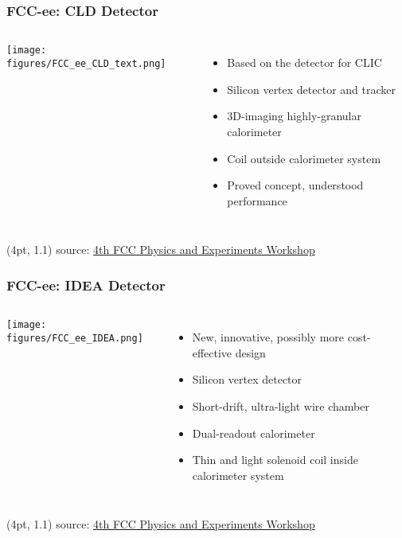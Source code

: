 \documentclass[aspectratio=169]{beamer}
\begin{document}
\begin{frame}
  \frametitle{FCC-ee: CLD Detector}

  \begin{columns}[c]
    \begin{center}
      \texttt{[image: figures/FCC\_ee\_CLD\_text.png]}
    \end{center}

    \begin{itemize}
      \item Based on the detector for CLIC
      \item Silicon vertex detector and tracker
      \item 3D-imaging highly-granular calorimeter
      \item Coil outside calorimeter system
      \item Proved concept, understood performance
    \end{itemize}
  \end{columns}

  \begin{textblock*}{\paperwidth}(4pt, 1.1\textheight)
    \tiny source:
    \href{https://indico.cern.ch/event/932973/}
         {4th FCC Physics and Experiments Workshop}
  \end{textblock*}
\end{frame}

\begin{frame}
  \frametitle{FCC-ee: IDEA Detector}

  \begin{columns}[c]
    \begin{center}
      \texttt{[image: figures/FCC\_ee\_IDEA.png]}
    \end{center}

    \begin{itemize}
      \item New, innovative, possibly more cost-effective design
      \item Silicon vertex detector
      \item Short-drift, ultra-light wire chamber
      \item Dual-readout calorimeter
      \item Thin and light solenoid coil inside calorimeter system
    \end{itemize}
  \end{columns}

  \begin{textblock*}{\paperwidth}(4pt, 1.1\textheight)
    \tiny source:
    \href{https://indico.cern.ch/event/932973/}
         {4th FCC Physics and Experiments Workshop}
  \end{textblock*}
\end{frame}
\end{document}
